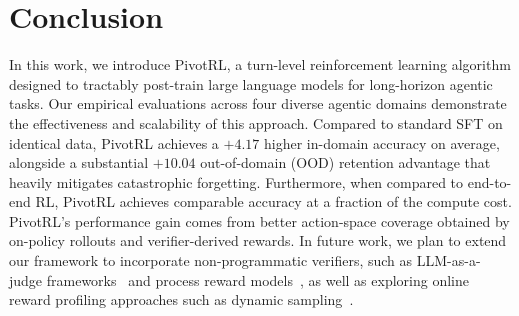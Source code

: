 \section{Conclusion}
\label{sec:conclusion}

In this work, we introduce PivotRL, a turn-level reinforcement learning algorithm designed to tractably post-train large language models for long-horizon agentic tasks. 
Our empirical evaluations across four diverse agentic domains demonstrate the effectiveness and scalability of this approach. Compared to standard SFT on identical data, PivotRL achieves a $+4.17$ higher in-domain accuracy on average, alongside a substantial $+10.04$ out-of-domain (OOD) retention advantage that heavily mitigates catastrophic forgetting. Furthermore, when compared to end-to-end RL, PivotRL achieves comparable accuracy at a fraction of the compute cost.
PivotRL's performance gain comes from better action-space coverage obtained by on-policy rollouts and verifier-derived rewards.
In future work, we plan to extend our framework to incorporate non-programmatic verifiers, such as LLM-as-a-judge frameworks~\citep{zheng2023judgingllmasajudgemtbenchchatbot} and process reward models~\citep{lightman2023letsverifystepstep}, as well as exploring online reward profiling approaches such as dynamic sampling~\citep{yu2025dapoopensourcellmreinforcement}.